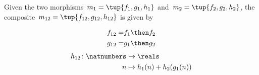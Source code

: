 {    Given the two morphisms~$m_1 = \tup{f_1, g_1, h_1}$ and~$m_2 = \tup{f_2, g_2, h_2}$, the composite~$m_{12} = \tup{f_{12}, g_{12}, h_{12}}$ is given by

    \begin{eqnarray}
        f_{12} = & f_1 \then f_2 \\
        g_{12} = & g_1 \then g_2 \\
    \end{eqnarray}
    \begin{eqnarray}
        h_{12} \colon \natnumbers & \to \reals                     \\
        n                         & \mapsto h_1(n) + h_2( g_1 (n)) 
    \end{eqnarray}
}
